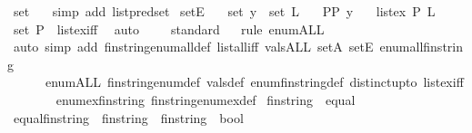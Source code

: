 \begin{isabellebody}
\ set\ \ \isamarkupfalse%
\ {\isacharparenleft}simp\ add{\isacharcolon}\ list{\isachardot}pred{\isacharunderscore}set{\isacharparenright}%
\endisatagproof
{\isafoldproof}%
%
\isadelimproof
\isanewline
%
\endisadelimproof
\isanewline
{}\isamarkupfalse%
\ setE{\isacharcolon}\isanewline
\ \ \ set{\isacharcolon}{\isachardoublequoteopen}\ y\ {\isasymin}\ set\ L{\isachardoublequoteclose}\isanewline
\ \ \ P{\isacharcolon}{\isachardoublequoteopen}P\ y{\isachardoublequoteclose}\isanewline
\ \ \ {\isachardoublequoteopen}list{\isacharunderscore}ex\ P\ L{\isachardoublequoteclose}\isanewline
%
\isadelimproof
\ \ %
\endisadelimproof
%
\isatagproof
{}\isamarkupfalse%
\ set\ P\ \ list{\isacharunderscore}ex{\isacharunderscore}iff\ \isamarkupfalse%
\ auto%
\endisatagproof
{\isafoldproof}%
%
\isadelimproof
\isanewline
%
\endisadelimproof
\isanewline
{}\isamarkupfalse%
\ \isanewline
%
\isadelimproof
\ \ %
\endisadelimproof
%
\isatagproof
{}\isamarkupfalse%
{\isacharparenleft}standard{\isacharparenright}\isanewline
\ \ \isamarkupfalse%
{\isacharparenleft}rule\ enum{\isacharunderscore}ALL{\isacharparenright}\isanewline
\ \ \isamarkupfalse%
\ {\isacharparenleft}auto\ simp\ add{\isacharcolon}\ fin{\isacharunderscore}string{\isacharunderscore}enum{\isacharunderscore}all{\isacharunderscore}def\ list{\isacharunderscore}all{\isacharunderscore}iff\ vals{\isacharunderscore}ALL\ setA\ setE\ enum{\isacharunderscore}all{\isacharunderscore}fin{\isacharunderscore}string\isanewline
\ \ \ \ \ \ enum{\isacharunderscore}ALL\ fin{\isacharunderscore}string{\isacharunderscore}enum{\isacharunderscore}def\ vals{\isacharunderscore}def\ enum{\isacharunderscore}fin{\isacharunderscore}string{\isacharunderscore}def\ distinct{\isacharunderscore}upto\ list{\isacharunderscore}ex{\isacharunderscore}iff\ \isanewline
\ \ \ \ \ \ enum{\isacharunderscore}ex{\isacharunderscore}fin{\isacharunderscore}string\ fin{\isacharunderscore}string{\isacharunderscore}enum{\isacharunderscore}ex{\isacharunderscore}def{\isacharparenright}%
\endisatagproof
{\isafoldproof}%
%
\isadelimproof
\isanewline
%
\endisadelimproof
{}\isamarkupfalse%
\isanewline
\isanewline
{}\isamarkupfalse%
\ fin{\isacharunderscore}string\ {\isacharcolon}{\isacharcolon}\ equal\ \isanewline
{}\isamarkupfalse%
\ equal{\isacharunderscore}fin{\isacharunderscore}string\ {\isacharcolon}{\isacharcolon}\ {\isachardoublequoteopen}fin{\isacharunderscore}string\ {\isasymRightarrow}\ fin{\isacharunderscore}string\ {\isasymRightarrow}\ bool{\isachardoublequoteclose}\isanewline

\end{isabellebody}

